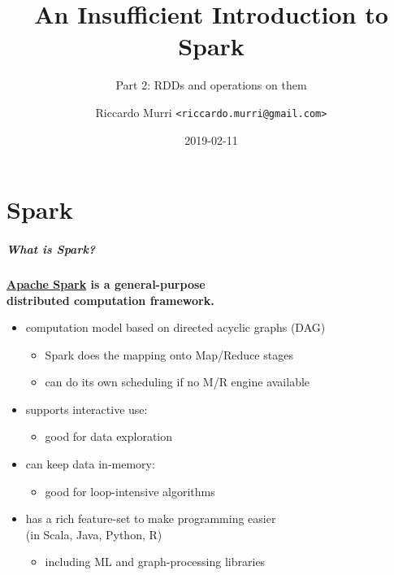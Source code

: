 \documentclass[english,serif,mathserif]{beamer}
\begin{document}
\title[Spark]{An Insufficient Introduction to Spark}
\subtitle{Part 2: RDDs and operations on them}
\author{Riccardo Murri \texttt{<riccardo.murri@gmail.com>}}
\date{2019-02-11}

\maketitle


\part{Spark}
\begin{frame}
  \frametitle{What is Spark?}
  \small

  \begin{center}
    {\bfseries \href{http://spark.apache.org}{Apache Spark} is a general-purpose
      \\ distributed computation framework.}
  \end{center}
  \+
  \begin{itemize}
  \item computation model based on directed acyclic graphs (DAG)
    \begin{itemize}
    \item Spark does the mapping onto Map/Reduce stages
    \item can do its own scheduling if no M/R engine available
    \end{itemize}

  \item supports interactive use:
    \begin{itemize}
    \item good for data exploration
    \end{itemize}

  \item can keep data in-memory:
    \begin{itemize}
    \item good for loop-intensive algorithms
    \end{itemize}

  \item has a rich feature-set to make programming easier \\ (in Scala, Java, Python, R)
    \begin{itemize}
    \item including ML and graph-processing libraries
    \end{itemize}

  \end{itemize}
\end{frame}
\end{document}

